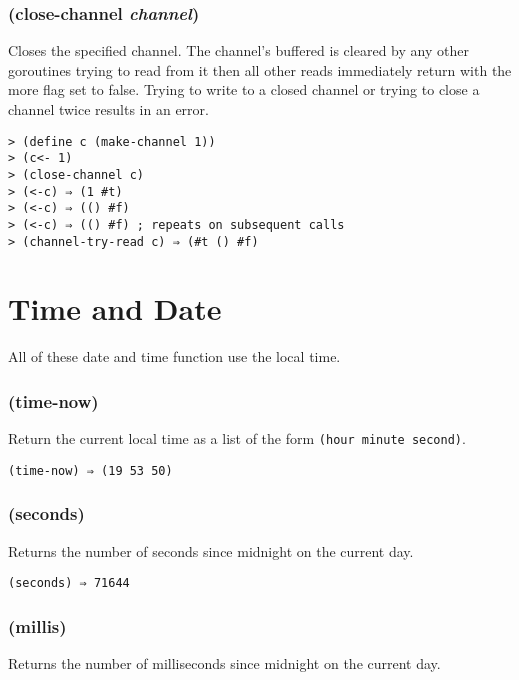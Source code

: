 \documentclass{article}
\begin{document}
\subsubsection{(close-channel \emph{channel})}

Closes the specified channel. The channel's buffered is cleared by any other goroutines trying
to read from it then all other reads immediately return with the more flag set to false.
Trying to write to a closed channel or trying to close a channel twice results in an error.

\begin{verbatim}
> (define c (make-channel 1))
> (c<- 1)
> (close-channel c)
> (<-c) ⇒ (1 #t)
> (<-c) ⇒ (() #f)
> (<-c) ⇒ (() #f) ; repeats on subsequent calls
> (channel-try-read c) ⇒ (#t () #f)
\end{verbatim}

\section{Time and Date}
\label{sec:time-date}

All of these date and time function use the local time.

\subsubsection{(time-now)}
\label{sec:time-now}

Return the current local time as a list of the form \verb|(hour minute second)|.

\begin{verbatim}
(time-now) ⇒ (19 53 50)
\end{verbatim}

\subsubsection{(seconds)}
\label{sec:seconds}

Returns the number of seconds since midnight on the current day.

\begin{verbatim}
(seconds) ⇒ 71644
\end{verbatim}

\subsubsection{(millis)}
\label{sec:seconds}

Returns the number of milliseconds since midnight on the current day.
\end{document}
